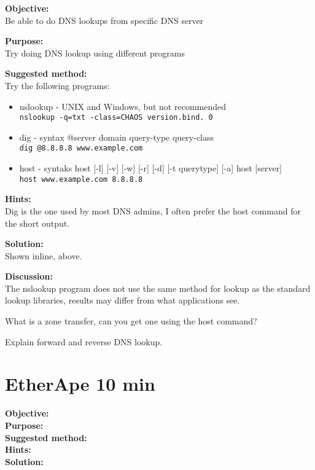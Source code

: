 \documentclass[a4paper,11pt,notitlepage]{report}
\begin{document}
{\bf Objective:}\\
Be able to do DNS lookups from specific DNS server

{\bf Purpose:}\\
Try doing DNS lookup using different programs

{\bf Suggested method:}\\
Try the following programs:
\begin{itemize}
\item nslookup - UNIX and Windows, but not recommended\\
\verb+nslookup -q=txt -class=CHAOS version.bind. 0+
\item dig - syntax @server domain query-type query-class\\
\verb+dig @8.8.8.8 www.example.com+
\item host - syntaks host [-l] [-v] [-w] [-r] [-d] [-t querytype] [-a] host [server]\\
\verb+host www.example.com 8.8.8.8+
\end{itemize}

{\bf Hints:}\\
Dig is the one used by most DNS admins, I often prefer the host command for the short output.

{\bf Solution:}\\
Shown inline, above.

{\bf Discussion:}\\
The nslookup program does not use the same method for lookup as the standard lookup libraries, results may differ from what applications see.

What is a zone transfer, can you get one using the host command?

Explain forward and reverse DNS lookup.




\chapter{EtherApe 10 min}
\label{ex:etherape}

{\bf Objective:}\\


{\bf Purpose:}\\


{\bf Suggested method:}\\


{\bf Hints:}\\


{\bf Solution:}\\
\end{document}
